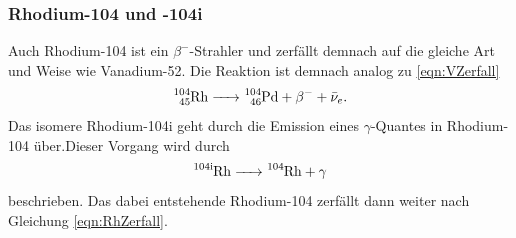 \subsubsection*{Rhodium-104 und -104i}
Auch Rhodium-104 ist ein $\beta^-$-Strahler und zerfällt demnach auf die gleiche Art und Weise wie 
Vanadium-52. Die Reaktion ist demnach analog zu \ref{eqn:VZerfall}
\begin{equation}
    \ce{^{104}_{45}Rh -> ^{104}_{46}Pd}+\beta^-+\bar{\nu}_e. 
    \label{eqn:RhZerfall}
\end{equation}
Das isomere Rhodium-104i geht durch die Emission eines $\gamma$-Quantes in Rhodium-104 über.Dieser 
Vorgang wird durch
\begin{equation}
    \ce{^{104 i}Rh -> ^{104}Rh}+\gamma 
    \label{eqn:Rh-104i}
\end{equation}
beschrieben. Das dabei entstehende Rhodium-104 zerfällt dann weiter nach Gleichung \ref{eqn:RhZerfall}.
